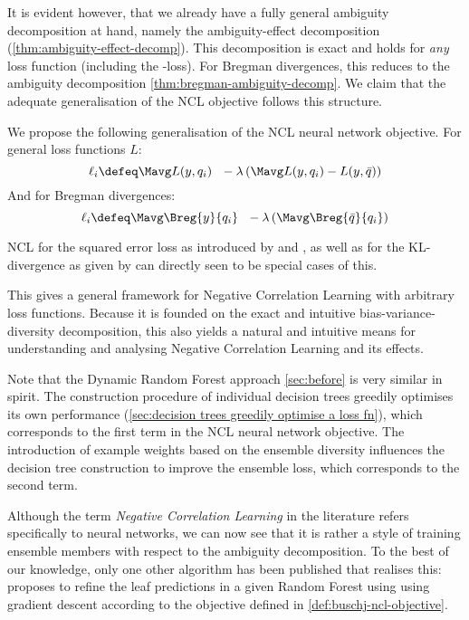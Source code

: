 \documentclass[../main.tex]{subfiles}
\begin{document}
It is evident however, {that we already have a fully general ambiguity decomposition at hand}, namely the ambiguity-effect decomposition (\ref{thm:ambiguity-effect-decomp}). 
This decomposition is exact and holds for \textit{any} loss function (including the \zeroone-loss). 
For Bregman divergences, this reduces to the ambiguity decomposition \ref{thm:bregman-ambiguity-decomp}.
%
We claim that the adequate generalisation of the NCL objective follows this structure.
\begin{definition} We propose the following generalisation of the NCL neural network objective. For general loss functions $L$:
$$
\ell_{i} \defeq \Mavg L(y, q_{i}) ~ ~ - \lambda \left( 
\Mavg L(y, q_{i}) - L(y, \bar{q})
\right)
$$
And for Bregman divergences:
$$
\ell_{i} \defeq \Mavg \Breg{y}{q_{i}} ~ ~ - \lambda\left( \Mavg \Breg{\bar{q}}{q_{i}} \right)
$$
\end{definition}
NCL for the squared error loss as introduced by \cite{LiuYao} and \cite{brown2005}, as well as for the KL-divergence as given by \cite{webb} can directly seen to be special cases of this.


This gives a general framework for Negative Correlation Learning with arbitrary loss functions. Because it is founded on the exact and intuitive bias-variance-diversity decomposition, this also yields a natural and intuitive means for understanding and analysing Negative Correlation Learning and its effects.

Note that the Dynamic Random Forest approach \ref{sec:before} is very similar in spirit. The construction procedure of individual decision trees greedily optimises its own performance (\ref{sec:decision trees greedily optimise a loss fn}), which corresponds to the first term in the NCL neural network objective. The introduction of example weights based on the ensemble diversity influences the decision tree construction to improve the ensemble loss, which corresponds to the second term.

Although the term \textit{Negative Correlation Learning} in the literature refers specifically to neural networks, we can now see that it is rather a style of training ensemble members with respect to the ambiguity decomposition.
To the best of our knowledge, only one other algorithm has been published that realises this: \cite{negative-correlation-forests} proposes to refine the leaf predictions in a given Random Forest using using gradient descent according to the objective defined in \ref{def:buschj-ncl-objective}.
\end{document}
